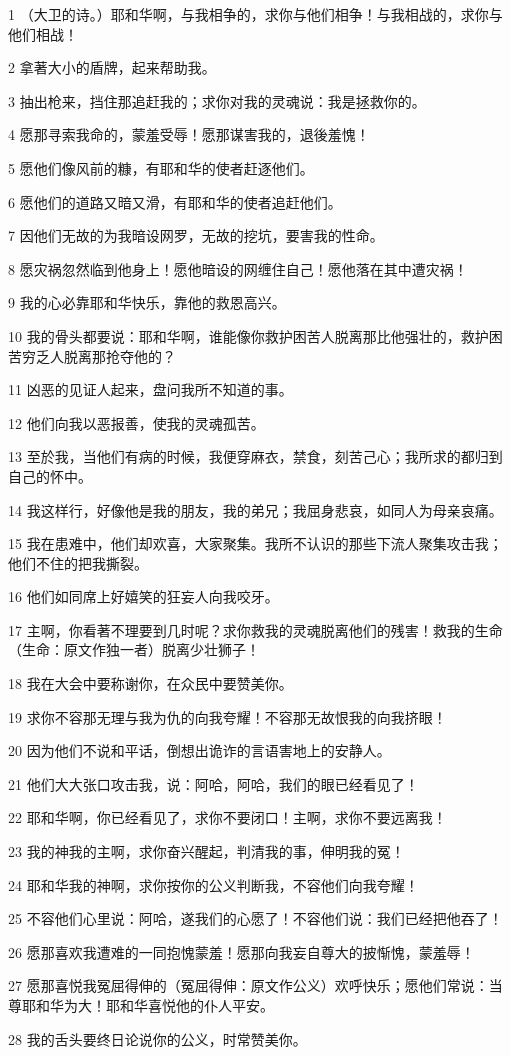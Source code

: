 \par 1 （大卫的诗。）耶和华啊，与我相争的，求你与他们相争！与我相战的，求你与他们相战！
\par 2 拿著大小的盾牌，起来帮助我。
\par 3 抽出枪来，挡住那追赶我的；求你对我的灵魂说：我是拯救你的。
\par 4 愿那寻索我命的，蒙羞受辱！愿那谋害我的，退後羞愧！
\par 5 愿他们像风前的糠，有耶和华的使者赶逐他们。
\par 6 愿他们的道路又暗又滑，有耶和华的使者追赶他们。
\par 7 因他们无故的为我暗设网罗，无故的挖坑，要害我的性命。
\par 8 愿灾祸忽然临到他身上！愿他暗设的网缠住自己！愿他落在其中遭灾祸！
\par 9 我的心必靠耶和华快乐，靠他的救恩高兴。
\par 10 我的骨头都要说：耶和华啊，谁能像你救护困苦人脱离那比他强壮的，救护困苦穷乏人脱离那抢夺他的？
\par 11 凶恶的见证人起来，盘问我所不知道的事。
\par 12 他们向我以恶报善，使我的灵魂孤苦。
\par 13 至於我，当他们有病的时候，我便穿麻衣，禁食，刻苦己心；我所求的都归到自己的怀中。
\par 14 我这样行，好像他是我的朋友，我的弟兄；我屈身悲哀，如同人为母亲哀痛。
\par 15 我在患难中，他们却欢喜，大家聚集。我所不认识的那些下流人聚集攻击我；他们不住的把我撕裂。
\par 16 他们如同席上好嬉笑的狂妄人向我咬牙。
\par 17 主啊，你看著不理要到几时呢？求你救我的灵魂脱离他们的残害！救我的生命（生命：原文作独一者）脱离少壮狮子！
\par 18 我在大会中要称谢你，在众民中要赞美你。
\par 19 求你不容那无理与我为仇的向我夸耀！不容那无故恨我的向我挤眼！
\par 20 因为他们不说和平话，倒想出诡诈的言语害地上的安静人。
\par 21 他们大大张口攻击我，说：阿哈，阿哈，我们的眼已经看见了！
\par 22 耶和华啊，你已经看见了，求你不要闭口！主啊，求你不要远离我！
\par 23 我的神我的主啊，求你奋兴醒起，判清我的事，伸明我的冤！
\par 24 耶和华我的神啊，求你按你的公义判断我，不容他们向我夸耀！
\par 25 不容他们心里说：阿哈，遂我们的心愿了！不容他们说：我们已经把他吞了！
\par 26 愿那喜欢我遭难的一同抱愧蒙羞！愿那向我妄自尊大的披惭愧，蒙羞辱！
\par 27 愿那喜悦我冤屈得伸的（冤屈得伸：原文作公义）欢呼快乐；愿他们常说：当尊耶和华为大！耶和华喜悦他的仆人平安。
\par 28 我的舌头要终日论说你的公义，时常赞美你。

